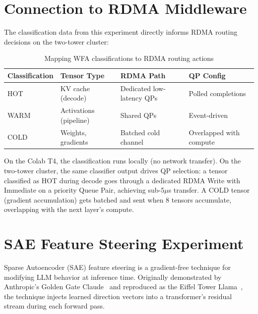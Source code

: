 \documentclass[11pt,letterpaper]{article}
\begin{document}
\section{Connection to RDMA Middleware}
\label{sec:rdma-connection}

The classification data from this experiment directly informs RDMA routing decisions on the two-tower cluster:

\begin{table}[htbp]
\centering
\caption{Mapping WFA classifications to RDMA routing actions}
\label{tab:wfa-rdma-mapping}
\begin{tabular}{@{}llll@{}}
\toprule
\textbf{Classification} & \textbf{Tensor Type} & \textbf{RDMA Path} & \textbf{QP Config} \\
\midrule
HOT & KV cache (decode) & Dedicated low-latency QPs & Polled completions \\
WARM & Activations (pipeline) & Shared QPs & Event-driven \\
COLD & Weights, gradients & Batched cold channel & Overlapped with compute \\
\bottomrule
\end{tabular}
\end{table}

On the Colab T4, the classification runs locally (no network transfer). On the two-tower cluster, the same classifier output drives QP selection: a tensor classified as HOT during decode goes through a dedicated RDMA Write with Immediate on a priority Queue Pair, achieving sub-5$\mu$s transfer. A COLD tensor (gradient accumulation) gets batched and sent when 8 tensors accumulate, overlapping with the next layer's compute.

\section{SAE Feature Steering Experiment}
\label{sec:sae-steering}

Sparse Autoencoder (SAE) feature steering is a gradient-free technique for modifying LLM behavior at inference time. Originally demonstrated by Anthropic's Golden Gate Claude~\cite{golden-gate-claude} and reproduced as the Eiffel Tower Llama~\cite{eiffel-tower-llama}, the technique injects learned direction vectors into a transformer's residual stream during each forward pass.
\end{document}
